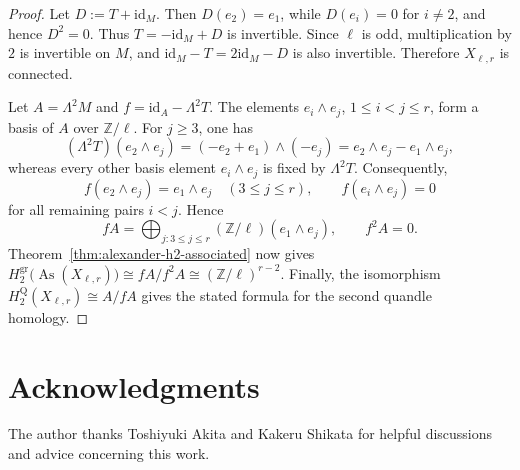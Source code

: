 \documentclass[11pt]{article}
\DeclareMathOperator{\As}{As}
\newcommand{\ZZ}{\mathbb Z}
\newcommand{\gr}{\mathrm{gr}}
\newcommand{\Q}{\mathrm Q}
\begin{document}
\begin{proof}
Let $D:=T+\mathrm{id}_M$. Then $D(e_2)=e_1$, while $D(e_i)=0$ for
$i\ne2$, and hence $D^2=0$. Thus $T=-\mathrm{id}_M+D$ is invertible.
Since $\ell$ is odd, multiplication by $2$ is invertible on $M$, and
$
 \mathrm{id}_M-T=2\mathrm{id}_M-D
$
is also invertible. Therefore $X_{\ell,r}$ is connected.

Let $A=\Lambda^2M$ and $f=\mathrm{id}_A-\Lambda^2T$. The elements
$e_i\wedge e_j$, $1\le i<j\le r$, form a basis of $A$ over $\ZZ/\ell$.
For $j\ge3$, one has
\[
 (\Lambda^2T)(e_2\wedge e_j)
 =(-e_2+e_1)\wedge(-e_j)
 =e_2\wedge e_j-e_1\wedge e_j,
\]
whereas every other basis element $e_i\wedge e_j$ is fixed by
$\Lambda^2T$. Consequently,
\[
 f(e_2\wedge e_j)=e_1\wedge e_j\quad(3\le j\le r),
 \qquad
 f(e_i\wedge e_j)=0
\]
for all remaining pairs $i<j$. Hence
\[
 fA=\bigoplus_{j : 3\leq j \leq r}(\ZZ/\ell)(e_1\wedge e_j),
 \qquad
 f^2A=0.
\]
Theorem~\ref{thm:alexander-h2-associated} now gives
$
 H_2^{\gr}\bigl(\As(X_{\ell,r})\bigr)
 \cong fA/f^2A
 \cong(\ZZ/\ell)^{r-2}.
$
Finally, the isomorphism $H_2^\Q(X_{\ell,r})\cong A/fA$ gives the stated
formula for the second quandle homology.
\end{proof}

\section*{Acknowledgments}
The author thanks Toshiyuki Akita and Kakeru Shikata for helpful discussions
and advice concerning this work.
\end{document}
